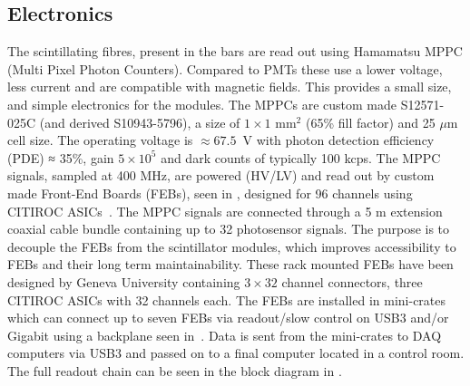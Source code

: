 
\subsection{Electronics}
The scintillating fibres, present in the bars are read out using Hamamatsu MPPC (Multi Pixel Photon Counters). Compared to PMTs these use a lower voltage, less current and are compatible with magnetic fields. This provides a small size, and simple electronics for the modules. The MPPCs are custom made S12571-025C (and derived S10943-5796), a size of $1\times1$ mm$^2$ (65\% fill factor) and 25 $\mu$m cell size. The operating voltage is $\approx 67.5$~V with photon detection efficiency (PDE) ≈ 35\%, gain $5 \times 10^5$ and dark counts of typically 100 kcps. The MPPC signals, sampled at 400 MHz, are powered (HV/LV) and read out by custom made Front-End Boards (FEBs), seen in , designed for 96 channels using CITIROC ASICs~\cite{78EASIROC}. The MPPC signals are connected through a 5 m extension coaxial cable bundle containing up to 32 photosensor signals. The purpose is to decouple the FEBs from the scintillator modules, which improves accessibility to FEBs and their long term maintainability. These rack mounted FEBs have been designed by Geneva University containing $3 \times 32$ channel connectors, three CITIROC ASICs with 32 channels each. The FEBs are installed in mini-crates which can connect up to seven FEBs via readout/slow control on USB3 and/or Gigabit using a backplane seen in~. 
Data is sent from the mini-crates to DAQ computers via USB3 and passed on to a final computer located in a control room. The full readout chain can be seen in the block diagram in .





